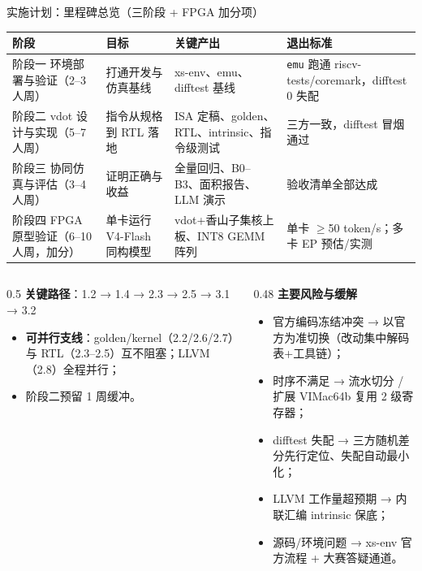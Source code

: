 \documentclass[aspectratio=169]{beamer}
\newcommand{\smalltable}[1]{\par\centering\scriptsize #1\par}
\begin{document}
\begin{frame}{实施计划：里程碑总览（三阶段 + FPGA 加分项）}
\smalltable{%
\begin{tabular}{@{}llll@{}}
\toprule
阶段 & 目标 & 关键产出 & 退出标准 \\
\midrule
阶段一 环境部署与验证（2–3 人周） & 打通开发与仿真基线 & xs-env、emu、difftest 基线 & \texttt{emu} 跑通 riscv-tests/coremark，difftest 0 失配 \\
阶段二 vdot 设计与实现（5–7 人周） & 指令从规格到 RTL 落地 & ISA 定稿、golden、RTL、intrinsic、指令级测试 & 三方一致，difftest 冒烟通过 \\
阶段三 协同仿真与评估（3–4 人周） & 证明正确与收益 & 全量回归、B0–B3、面积报告、LLM 演示 & 验收清单全部达成 \\
阶段四 FPGA 原型验证（6–10 人周，加分） & 单卡运行 V4-Flash 同构模型 & vdot+香山子集核上板、INT8 GEMM 阵列 & 单卡 $\ge$50 token/s；多卡 EP 预估/实测 \\
\bottomrule
\end{tabular}}
\vspace{0.5em}
\begin{columns}[T]
\begin{column}{0.5\textwidth}
\textbf{关键路径}：1.2 → 1.4 → 2.3 → 2.5 → 3.1 → 3.2
\begin{itemize}
  \item \textbf{可并行支线}：golden/kernel（2.2/2.6/2.7）与 RTL（2.3–2.5）互不阻塞；LLVM（2.8）全程并行；
  \item 阶段二预留 1 周缓冲。
\end{itemize}
\end{column}
\begin{column}{0.48\textwidth}
\textbf{主要风险与缓解}
\begin{itemize}
  \item 官方编码冻结冲突 → 以官方为准切换（改动集中解码表+工具链）；
  \item 时序不满足 → 流水切分 / 扩展 VIMac64b 复用 2 级寄存器；
  \item difftest 失配 → 三方随机差分先行定位、失配自动最小化；
  \item LLVM 工作量超预期 → 内联汇编 intrinsic 保底；
  \item 源码/环境问题 → xs-env 官方流程 + 大赛答疑通道。
\end{itemize}
\end{column}
\end{columns}
\end{frame}
\end{document}
